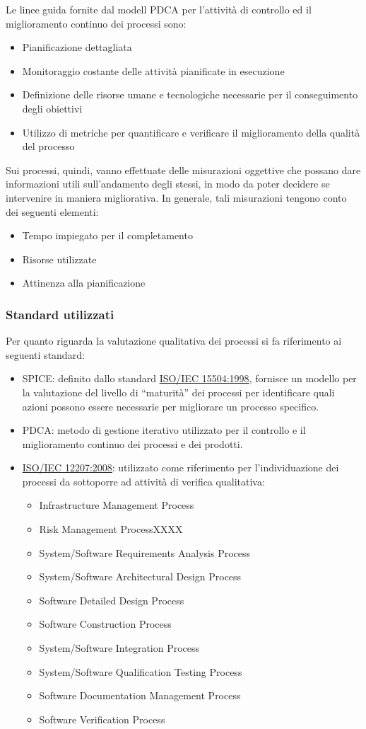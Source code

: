\documentclass[a4paper,11pt]{article}
\begin{document}
Le linee guida fornite dal modell PDCA per l'attività di controllo ed il miglioramento continuo dei processi sono:
\begin{itemize}
\item Pianificazione dettagliata
\item Monitoraggio costante delle attività pianificate in esecuzione
\item Definizione delle risorse umane e tecnologiche necessarie per il conseguimento degli obiettivi
\item Utilizzo di metriche per quantificare e verificare il miglioramento della qualità del processo
\end{itemize}  
Sui processi, quindi, vanno effettuate delle misurazioni oggettive che possano dare informazioni utili sull'andamento degli stessi, in modo da poter decidere se intervenire in maniera migliorativa. 
In generale, tali misurazioni tengono conto dei seguenti elementi: 
\begin{itemize}
\item Tempo impiegato per il completamento
\item Risorse utilizzate 
\item Attinenza alla pianificazione
\end{itemize}
\subsubsection{Standard utilizzati}
Per quanto riguarda la valutazione qualitativa dei processi si fa riferimento ai seguenti standard: 
\begin{itemize}
\item SPICE\addglos : definito dallo standard \underline{ISO/IEC 15504:1998}, fornisce un modello per la valutazione del livello di “maturità”
dei processi per identificare quali azioni possono essere necessarie per migliorare un processo specifico.
\item PDCA\addglos : metodo di gestione iterativo utilizzato per il controllo e il miglioramento continuo dei processi e dei prodotti.
\item \underline{ISO/IEC 12207:2008}: utilizzato come riferimento per l'individuazione dei processi da sottoporre ad attività di verifica qualitativa:
\begin{itemize}
\item Infrastructure Management Process
\item Risk Management ProcessXXXX
\item System/Software Requirements Analysis Process
\item System/Software Architectural Design Process
\item Software Detailed Design Process
\item Software Construction Process
\item System/Software Integration Process
\item System/Software Qualification Testing Process
\item Software Documentation Management Process
\item Software Verification Process

\end{itemize} 
\end{itemize}
\end{document}
